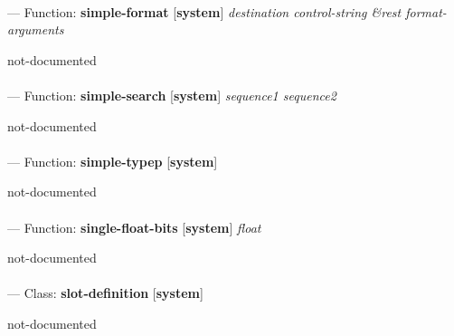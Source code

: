 \paragraph{}
\label{SYSTEM:SIMPLE-FORMAT}
--- Function: \textbf{simple-format} [\textbf{system}] \textit{destination control-string \&rest format-arguments}

\begin{adjustwidth}{5em}{5em}
not-documented
\end{adjustwidth}

\paragraph{}
\label{SYSTEM:SIMPLE-SEARCH}
--- Function: \textbf{simple-search} [\textbf{system}] \textit{sequence1 sequence2}

\begin{adjustwidth}{5em}{5em}
not-documented
\end{adjustwidth}

\paragraph{}
\label{SYSTEM:SIMPLE-TYPEP}
--- Function: \textbf{simple-typep} [\textbf{system}] \textit{}

\begin{adjustwidth}{5em}{5em}
not-documented
\end{adjustwidth}

\paragraph{}
\label{SYSTEM:SINGLE-FLOAT-BITS}
--- Function: \textbf{single-float-bits} [\textbf{system}] \textit{float}

\begin{adjustwidth}{5em}{5em}
not-documented
\end{adjustwidth}

\paragraph{}
\label{SYSTEM:SLOT-DEFINITION}
--- Class: \textbf{slot-definition} [\textbf{system}] \textit{}

\begin{adjustwidth}{5em}{5em}
not-documented
\end{adjustwidth}

